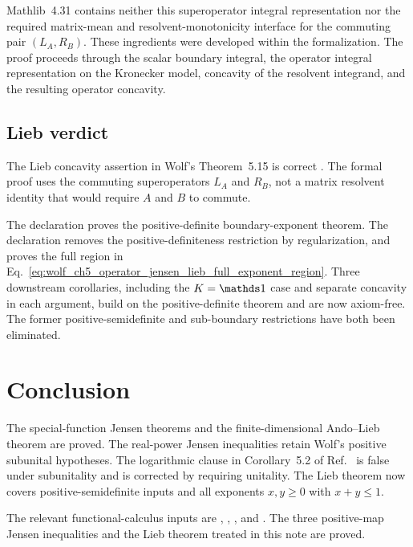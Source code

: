 \documentclass{article}
\begin{document}
Mathlib~4.31 contains neither this superoperator integral representation nor
the required matrix-mean and resolvent-monotonicity interface for the commuting
pair $(L_A,R_B)$. These ingredients were developed within the formalization.
The proof proceeds through the scalar boundary integral, the operator integral
representation on the Kronecker model, concavity of the resolvent integrand,
and the resulting operator concavity.

\subsection{Lieb verdict}

The Lieb concavity assertion in Wolf's Theorem~5.15 is correct
\cite[Theorem~5.15]{Wolf2012Quantum}. The formal proof uses the commuting
superoperators $L_A$ and $R_B$, not a matrix resolvent identity that would
require $A$ and $B$ to commute.

The declaration  proves the positive-definite
boundary-exponent theorem. The declaration  removes
the positive-definiteness restriction by regularization, and
 proves the full region in
Eq.~\ref{eq:wolf_ch5_operator_jensen_lieb_full_exponent_region}. Three
downstream corollaries, including the $K=\Id$ case and separate concavity in
each argument, build on the positive-definite theorem and are now axiom-free.
The former positive-semidefinite and sub-boundary restrictions have both been
eliminated.

\section{Conclusion}

The special-function Jensen theorems and the finite-dimensional Ando--Lieb
theorem are proved. The real-power Jensen inequalities retain Wolf's positive
subunital hypotheses. The logarithmic clause in Corollary~5.2 of
Ref.~\cite{Wolf2012Quantum} is false under subunitality and is corrected by
requiring unitality. The Lieb theorem now covers positive-semidefinite inputs
and all exponents $x,y\geq 0$ with $x+y\leq 1$.

The relevant functional-calculus inputs are
,
, , and
. The three positive-map Jensen inequalities and the
Lieb theorem treated in this note are proved.



\end{document}
